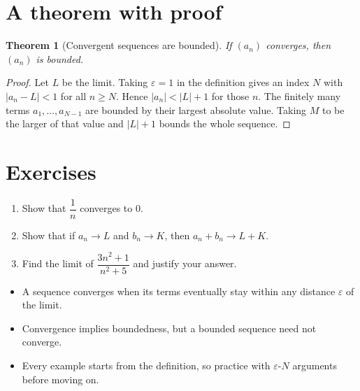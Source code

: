 \documentclass[11pt,parskip=half]{scrartcl}
\theoremstyle{plain}
\newtheorem{theorem}{Theorem}[section]
\begin{document}
\section{A theorem with proof}

\begin{theorem}[Convergent sequences are bounded]\label{thm:bounded}
  If $(a_n)$ converges, then $(a_n)$ is bounded.
\end{theorem}

\begin{proof}
  Let $L$ be the limit. Taking $\varepsilon = 1$ in the definition gives an
  index $N$ with $|a_n - L| < 1$ for all $n \ge N$. Hence $|a_n| < |L| + 1$
  for those $n$. The finitely many terms $a_1, \dots, a_{N-1}$ are bounded
  by their largest absolute value. Taking $M$ to be the larger of that value
  and $|L| + 1$ bounds the whole sequence.
\end{proof}

\section{Exercises}

\begin{enumerate}
  \item Show that $\dfrac{1}{n}$ converges to $0$.
  \item Show that if $a_n \to L$ and $b_n \to K$, then $a_n + b_n \to L + K$.
  \item Find the limit of $\dfrac{3n^2 + 1}{n^2 + 5}$ and justify your answer.
\end{enumerate}

\begin{summarybox}
  \begin{itemize}
    \item A sequence converges when its terms eventually stay within any
      distance $\varepsilon$ of the limit.
    \item Convergence implies boundedness, but a bounded sequence need not converge.
    \item Every example starts from the definition, so practice with
      $\varepsilon$-$N$ arguments before moving on.
  \end{itemize}
\end{summarybox}
\end{document}
